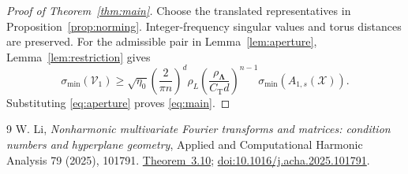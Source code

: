 \documentclass[11pt]{article}
\newcommand{\V}{\mathcal V}
\newcommand{\X}{\mathcal X}
\begin{document}
\begin{proof}[Proof of Theorem~\ref{thm:main}]
Choose the translated representatives in Proposition~\ref{prop:norming}. Integer-frequency singular values and torus distances are preserved. For the admissible pair in Lemma~\ref{lem:aperture}, Lemma~\ref{lem:restriction} gives
\begin{equation}\label{eq:product-bound}
\sigma_{\min}(\V_1)\ge\sqrt{\eta_0}\left(\frac2{\pi n}\right)^d\rho_L\left(\frac{\rho_{\bm\Lambda}}{C_{\mathrm T}d}\right)^{n-1}\sigma_{\min}(A_{1,s}(\X)).
\end{equation}
Substituting \eqref{eq:aperture} proves \eqref{eq:main}.
\end{proof}

\begin{thebibliography}{9}
 W. Li, \emph{Nonharmonic multivariate Fourier transforms and matrices: condition numbers and hyperplane geometry}, Applied and Computational Harmonic Analysis 79 (2025), 101791. \href{https://arxiv.org/html/2407.10313v2\#S3}{Theorem~3.10}; \href{https://doi.org/10.1016/j.acha.2025.101791}{doi:10.1016/j.acha.2025.101791}.
\end{thebibliography}
\end{document}
